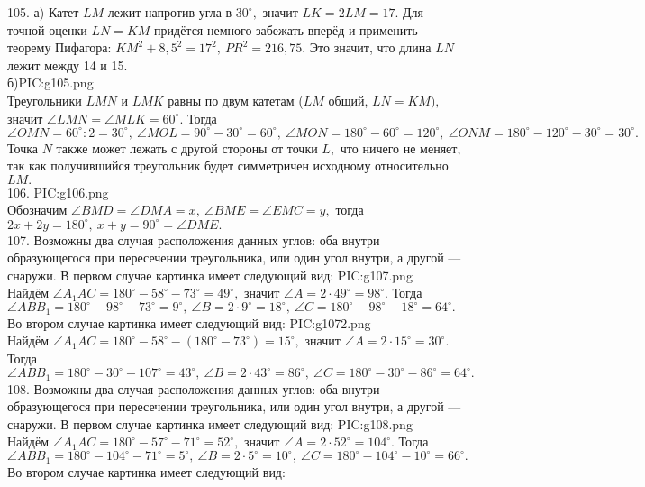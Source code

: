 105. а) Катет $LM$ лежит напротив угла в $30^\circ,$ значит $LK=2LM=17.$ Для точной оценки $LN=KM$ придётся немного забежать вперёд и применить теорему Пифагора: $KM^2+8,5^2=17^2,\ PR^2=216,75.$ Это значит, что длина $LN$ лежит между 14 и 15.\\
б){{PIC:g105.png}}\\
Треугольники $LMN$ и $LMK$ равны по двум катетам ($LM$ общий, $LN=KM),$ значит $\angle LMN=\angle MLK=60^\circ.$ Тогда $\angle OMN=60^\circ:2=30^\circ,\ \angle MOL=90^\circ-30^\circ=60^\circ,\ \angle MON=180^\circ-60^\circ=120^\circ,\ \angle ONM=180^\circ-120^\circ-30^\circ=30^\circ.$ Точка $N$ также может лежать с другой стороны от точки $L,$ что ничего не меняет, так как получившийся треугольник будет симметричен исходному относительно $LM.$\\
106. {{PIC:g106.png}}\\
Обозначим $\angle BMD=\angle DMA=x,\ \angle BME=\angle EMC=y,$ тогда $2x+2y=180^\circ,\ x+y=90^\circ=\angle DME.$\\
107. Возможны два случая расположения данных углов: оба внутри образующегося при пересечении треугольника, или один угол внутри, а другой --- снаружи. В первом случае картинка имеет следующий вид:
{{PIC:g107.png}}\\
Найдём $\angle A_1AC=180^\circ-58^\circ-73^\circ=49^\circ,$ значит $\angle A=2\cdot49^\circ=98^\circ.$ Тогда $\angle ABB_1=180^\circ-98^\circ-73^\circ=9^\circ,\ \angle B=2\cdot9^\circ=18^\circ,\ \angle C=180^\circ-98^\circ-18^\circ=64^\circ.$\\
Во втором случае картинка имеет следующий вид:
{{PIC:g1072.png}}\\
Найдём $\angle A_1AC=180^\circ-58^\circ-(180^\circ-73^\circ)=15^\circ,$ значит $\angle A=2\cdot15^\circ=30^\circ.$ Тогда $\angle ABB_1=180^\circ-30^\circ-107^\circ=43^\circ,\ \angle B=2\cdot43^\circ=86^\circ,\ \angle C=180^\circ-30^\circ-86^\circ=64^\circ.$\\
108. Возможны два случая расположения данных углов: оба внутри образующегося при пересечении треугольника, или один угол внутри, а другой --- снаружи. В первом случае картинка имеет следующий вид:
{{PIC:g108.png}}\\
Найдём $\angle A_1AC=180^\circ-57^\circ-71^\circ=52^\circ,$ значит $\angle A=2\cdot52^\circ=104^\circ.$ Тогда $\angle ABB_1=180^\circ-104^\circ-71^\circ=5^\circ,\ \angle B=2\cdot5^\circ=10^\circ,\ \angle C=180^\circ-104^\circ-10^\circ=66^\circ.$\\
Во втором случае картинка имеет следующий вид:\\

